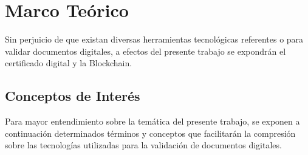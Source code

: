 \chapter{Marco Teórico}







Sin perjuicio de que existan diversas herramientas tecnológicas referentes o para validar documentos
digitales, a efectos del presente trabajo se expondrán el certificado digital y la Blockchain.



\section{Conceptos de Interés}
Para mayor entendimiento sobre la temática del presente 
trabajo, se exponen a continuación determinados términos y 
conceptos que facilitarán la compresión sobre las tecnologías utilizadas para la validación de documentos digitales.











 


